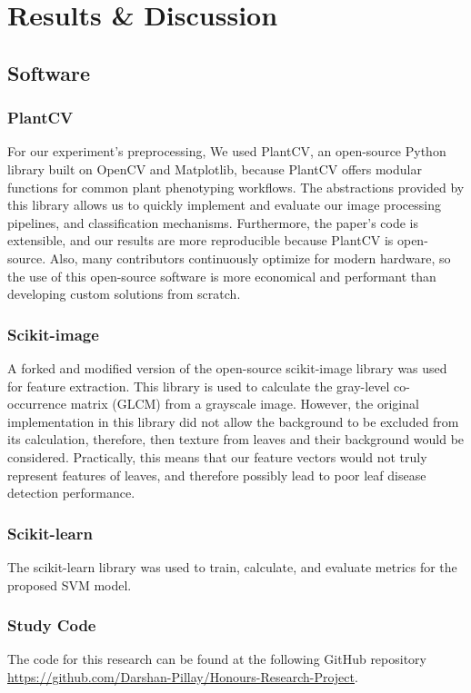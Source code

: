 \chapter{Results \& Discussion}

\section{Software}
\subsection{PlantCV}
For our experiment’s preprocessing, We used PlantCV, an open-source Python library built on OpenCV and Matplotlib, because PlantCV offers modular functions for common plant phenotyping workflows. The abstractions provided by this library allows us to quickly implement and evaluate our image processing pipelines, and classification mechanisms. Furthermore, the paper’s code is extensible, and our results are more reproducible because PlantCV is open-source. Also, many contributors continuously optimize for modern hardware, so the use of this open-source software is more economical and performant than developing custom solutions from scratch.

\subsection{Scikit-image}
A forked and modified version of the open-source scikit-image library was used for feature extraction. This library is used to calculate the gray-level co-occurrence matrix (GLCM) from a grayscale image. However, the original implementation in this library did not allow the background to be excluded from its calculation, therefore, then texture from leaves and their background would be considered. Practically, this means that our feature vectors would not truly represent features of leaves, and therefore possibly lead to poor leaf disease detection performance.

\subsection{Scikit-learn}
The scikit-learn library was used to train, calculate, and evaluate metrics for the proposed SVM model.

\subsection{Study Code}
The code for this research can be found at the following GitHub repository \url{https://github.com/Darshan-Pillay/Honours-Research-Project}.

